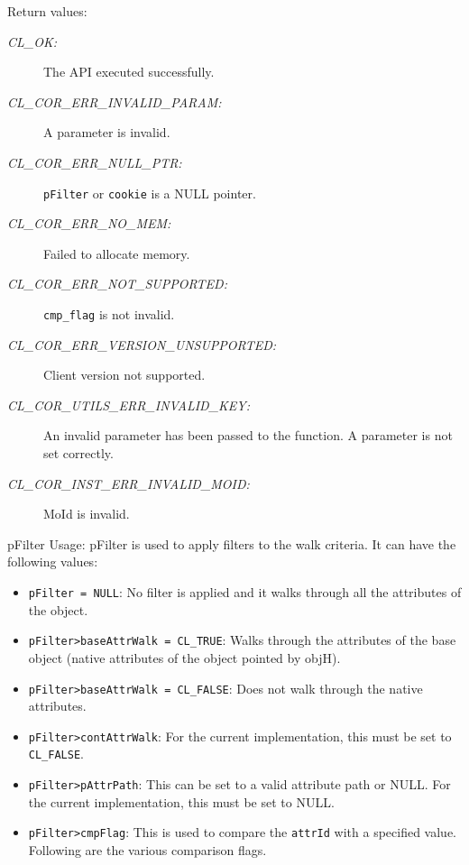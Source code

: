 \begin{flushleft}
\begin{Desc}
\item[Return values:]
\begin{description}
\item[{\em CL\_\-OK:}]The API executed successfully. 
\item[{\em CL\_\-COR\_\-ERR\_\-INVALID\_\-PARAM:}] A parameter is invalid.
\item[{\em CL\_\-COR\_\-ERR\_\-NULL\_\-PTR:}] {\tt{pFilter}} or {\tt{cookie}} is a NULL pointer.
\item[{\em CL\_\-COR\_\-ERR\_\-NO\_\-MEM:}] Failed to allocate memory. 
\item[{\em CL\_\-COR\_\-ERR\_\-NOT\_\-SUPPORTED:}] {\tt{cmp\_\-flag}} is not invalid.
\item[{\em CL\_\-COR\_\-ERR\_\-VERSION\_\-UNSUPPORTED:}] Client version not supported.
\item[{\em CL\_\-COR\_\-UTILS\_\-ERR\_\-INVALID\_\-KEY:}] An invalid parameter has been passed to the function. A parameter is not set correctly.
\item[{\em CL\_\-COR\_\-INST\_\-ERR\_\-INVALID\_\-MOID:}] MoId is invalid.
\end{description}
\end{Desc}

\begin{Desc}

\item[pFilter Usage:] pFilter is used to apply filters to the walk criteria. It can have the following values:
\begin{itemize}
\item
	{\tt{pFilter = NULL}}: No filter is applied and it walks through all the attributes of the object.
	\item
	{\tt{pFilter>baseAttrWalk = CL\_\-TRUE}}: Walks through the attributes of the base object (native attributes of the object pointed by objH).
	\item
	{\tt{pFilter>baseAttrWalk = CL\_\-FALSE}}: Does not walk through the native attributes.
	\item
	{\tt{pFilter>contAttrWalk}}: For the current implementation, this must be set to {\tt{CL\_\-FALSE}}. 
	\item
	{\tt{pFilter>pAttrPath}}: This can be set to a valid attribute path or NULL. For the current implementation, this must be set to NULL.
	\item
	{\tt{pFilter>cmpFlag}}: This is used to compare the {\tt{attrId}} with a specified value. Following are the various comparison flags.


\end{itemize}
\end{Desc}
\end{flushleft}
